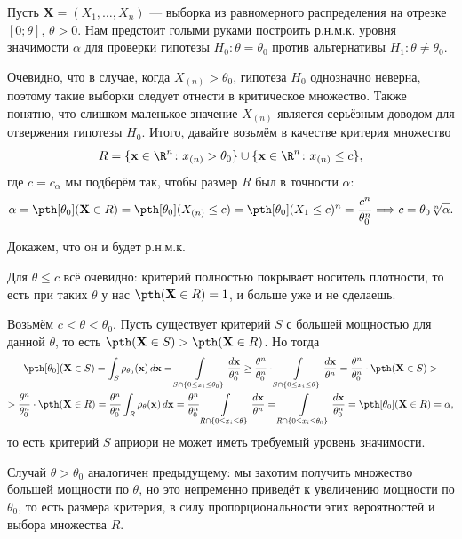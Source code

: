 \begin{example}
Пусть $\mathbf X = (X_1, \ldots, X_n)$ --- выборка из равномерного распределения на отрезке $[0; \theta]$, $\theta > 0$. Нам предстоит голыми руками построить р.н.м.к. уровня значимости $\alpha$ для проверки гипотезы $H_0\colon \theta = \theta_0$ против альтернативы $H_1\colon \theta \ne \theta_0$.

Очевидно, что в случае, когда $X_{(n)} > \theta_0$, гипотеза $H_0$ однозначно неверна, поэтому такие выборки следует отнести в критическое множество. Также понятно, что слишком маленькое значение $X_{(n)}$ является серьёзным доводом для отвержения гипотезы $H_0$. Итого, давайте возьмём в качестве критерия множество
\[
R = \{\mathbf{x} \in \R^n\colon x_{(n)} > \theta_0\} \cup \{\mathbf{x}\in\R^n\colon x_{(n)} \le c\},
\]
где $c = c_{\alpha}$ мы подберём так, чтобы размер $R$ был в точности $\alpha$:
\[
\alpha = \pth[\theta_0](\mathbf X \in R) = \pth[\theta_0](X_{(n)} \le c) = \pth[\theta_0](X_{1} \le c)^n = \frac{c^n}{\theta_0^n} \Longrightarrow c = \theta_0 \sqrt[n]{\alpha}.
\]


Докажем, что он и будет р.н.м.к.

Для $\theta \le c$ всё очевидно: критерий полностью покрывает носитель плотности, то есть при таких $\theta$ у нас $\pth(\mathbf X \in R) = 1$, и больше уже и не сделаешь.

Возьмём $c < \theta < \theta_0$. Пусть существует критерий $S$ с большей мощностью для данной $\theta$, то есть $\pth(\mathbf X \in S) > \pth(\mathbf X \in R)$. Но тогда
\begin{gather*}
    \pth[\theta_0](\mathbf X \in S) = \int_{S} \rho_{\theta_0}(\mathbf{x})\,d\mathbf{x} = \int\limits_{S\cap\{0 \le x_i \le \theta_0\}} \frac{d\mathbf{x}}{\theta_0^n} \ge \frac{\theta^n}{\theta_0^n} \cdot \int\limits_{S\cap\{0 \le x_i \le \theta\}} \frac{d\mathbf{x}}{\theta^n} = \frac{\theta^n}{\theta_0^n} \cdot \pth(\mathbf X \in S) >\\ > \frac{\theta^n}{\theta_0^n} \cdot \pth(\mathbf X \in R) = \frac{\theta^n}{\theta_0^n} \int_{R} \rho_{\theta}(\mathbf{x})\,d\mathbf{x} = \frac{\theta^n}{\theta_0^n} \int\limits_{R \cap \{0 \le x_i \le \theta\}} \frac{d\mathbf{x}}{\theta^n} = \int\limits_{R \cap \{0 \le x_i \le \theta_0\}} \frac{d\mathbf{x}}{\theta_0^n} = \pth[\theta_0](\mathbf X \in R) = \alpha,
\end{gather*}
то есть критерий $S$ априори не может иметь требуемый уровень значимости.

Случай $\theta > \theta_0$ аналогичен предыдущему: мы захотим получить множество большей мощности по $\theta$, но это непременно приведёт к увеличению мощности по $\theta_0$, то есть размера критерия, в силу пропорциональности этих вероятностей и выбора множества $R$.
\end{example}

